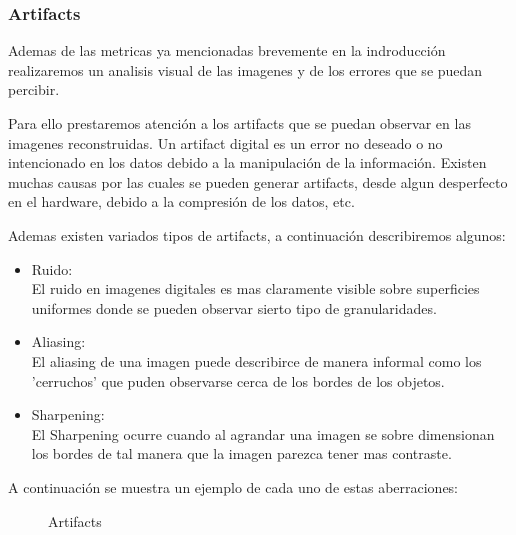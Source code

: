 \subsubsection{Artifacts}

Ademas de las metricas ya mencionadas brevemente en la indroducción realizaremos un analisis visual de las imagenes y de los errores que se puedan percibir.

Para ello prestaremos atención a los artifacts que se puedan observar en las imagenes reconstruidas. Un artifact digital es un error no deseado o no intencionado en los datos debido a la manipulación de la información. Existen muchas causas por las cuales se pueden generar artifacts, desde algun desperfecto en el hardware, debido a la compresión de los datos, etc.

Ademas existen variados tipos de artifacts, a continuación describiremos algunos:

\begin{itemize}
 \item Ruido:
 \\
 	El ruido en imagenes digitales es mas claramente visible sobre superficies uniformes donde se pueden observar sierto tipo de granularidades.
 \item Aliasing:
 \\
 	El aliasing de una imagen puede describirce de manera informal como los 'cerruchos' que puden observarse cerca de los bordes de los objetos.
 \item Sharpening:
 \\
 El Sharpening ocurre cuando al agrandar una imagen se sobre dimensionan los bordes de tal manera que la imagen parezca tener mas contraste.
\end{itemize}
A continuación se muestra un ejemplo de cada uno de estas aberraciones:
\begin{figure}[H]
\centering
{}
\qquad
{}
\qquad
{}
\caption{Artifacts}
\end{figure}

